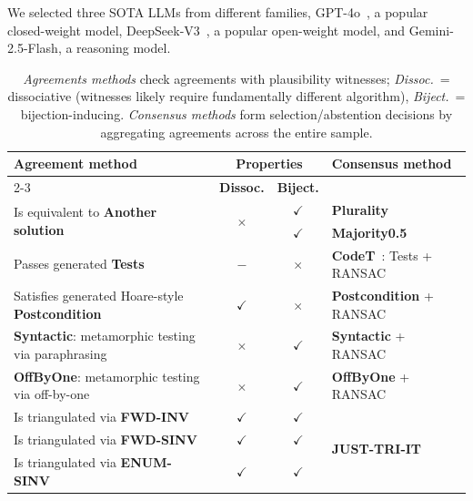 \documentclass[acmsmall,screen,nonacm]{acmart}
\begin{document}
We selected three SOTA LLMs from different families, GPT-4o~\cite{hurst2024gpt}, a popular closed-weight model, DeepSeek-V3~\cite{liu2024deepseek}, a popular open-weight model, and Gemini-2.5-Flash, a reasoning model.

\begin{table}[t]
  \centering
  \caption{\emph{Agreements methods} check agreements with plausibility witnesses; \emph{Dissoc.}~= dissociative (witnesses likely require fundamentally different algorithm), \emph{Biject.}~= bijection-inducing. \emph{Consensus methods} form selection/abstention decisions by aggregating agreements across the entire sample.}
  \vspace{-1mm}
  \label{tab:method-properties}
  \small
  \setlength{\tabcolsep}{5pt}
  \begin{tabular}{lcc|l}
  \toprule
  \multirow{2}{*}{\textbf{Agreement method}} &
  \multicolumn{2}{c}{\textbf{Properties}} & \multirow{2}{*}{\textbf{Consensus method}} \\
  \cmidrule(lr){2-3}
   & \textbf{Dissoc.} & \textbf{Biject.} & \\
  \midrule
  \multirow{2}{*}{Is equivalent to \textbf{Another solution}}          & \multirow{2}{*}{$\times$} & $\checkmark$ & \textbf{Plurality}          \\
                 &  & $\checkmark$ & \textbf{Majority0.5}
  \\
  Passes generated \textbf{Tests}               & $-$ & $\times$     & \textbf{CodeT}~\cite{chen2022codet}: Tests + RANSAC  \\
  Satisfies generated Hoare-style \textbf{Postcondition}          & $\checkmark$ & $\times$     & \textbf{Postcondition} + RANSAC   \\
  \textbf{Syntactic}: metamorphic testing via paraphrasing  & $\times$ & $\checkmark$ & \textbf{Syntactic} + RANSAC  \\
  \textbf{OffByOne}: metamorphic testing via off-by-one  & $\times$ & $\checkmark$ & \textbf{OffByOne} + RANSAC \\
  \midrule
  Is triangulated via \textbf{FWD-INV}    & $\checkmark$ & $\checkmark$ &
  \multirow{3}{*}{\textbf{JUST-TRI-IT}} \\
  Is triangulated via \textbf{FWD-SINV}       & $\checkmark$ & $\checkmark$ & \\
  Is triangulated via \textbf{ENUM-SINV} & $\checkmark$ & $\checkmark$ & \\
  \bottomrule
  \end{tabular}
  \end{table}
\end{document}
